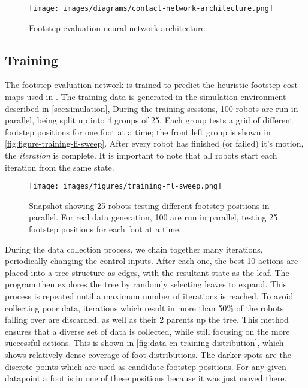 \begin{figure}[H]
  \centering
  \texttt{[image: images/diagrams/contact-network-architecture.png]}
  \caption{Footstep evaluation neural network architecture.}
  \label{fig:diagram-contactnet-architecture}
\end{figure}


\subsection{Training}

The footstep evaluation network is trained to predict the heuristic
footstep cost maps used in \cite{bratta_contactnet_2024}. The training
data is generated in the simulation environment described in
\autoref{sec:simulation},
During the training sessions, 100 robots are run in parallel, being split
up into 4 groups of 25. Each group tests a grid of different footstep
positions for one foot at a time; the front left group is shown in
\autoref{fig:figure-training-fl-sweep}.
After every robot has finished (or failed) it's motion, the
\textit{iteration} is complete.
It is important to note that all robots start each iteration from the
same state.

\begin{figure}[H]
  \centering
  \texttt{[image: images/figures/training-fl-sweep.png]}
  \caption{Snapshot showing 25 robots testing different footstep
    positions in parallel. For real data generation, 100 are run in
  parallel, testing 25 footstep positions for each foot at a time.}
  \label{fig:figure-training-fl-sweep}
\end{figure}

During the data collection process, we chain together many
iterations, periodically
changing the control inputs. After each one,
the best 10 actions are placed into a tree structure as edges, with
the resultant
state as the leaf. The program then explores the tree by randomly selecting
leaves to expand. This process is repeated until a maximum number of
iterations is reached.
To avoid collecting poor data, iterations which result in more than
50\% of the robots falling
over are discarded, as well as their 2 parents up the tree. This
method ensures that a diverse
set of data is collected, while still focusing on the more successful
actions. This is shown
in \autoref{fig:data-cn-training-distribution}, which shows
relatively dense coverage of
foot distributions. The darker spots are the discrete points which
are used as candidate
footstep positions. For any given datapoint a foot is in one of these
positions because it
was just moved there.


